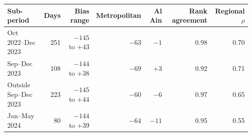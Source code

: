 \begin{tabular}{lrrrrrr}\toprule
Sub-period & Days & Bias range & Metropolitan & Al Ain & Rank agreement & Regional $\rho$ \\ \midrule
Oct 2022--Dec 2023 & 251 & $-145$ to $+43$ & $-63$ & $-1$ & 0.98 & 0.70 \\
Sep--Dec 2023 & 108 & $-144$ to $+38$ & $-69$ & $+3$ & 0.92 & 0.71 \\
Outside Sep--Dec 2023 & 223 & $-145$ to $+44$ & $-60$ & $-6$ & 0.97 & 0.65 \\
Jan--May 2024 & 80 & $-144$ to $+39$ & $-64$ & $-11$ & 0.95 & 0.55 \\
\bottomrule\end{tabular}
